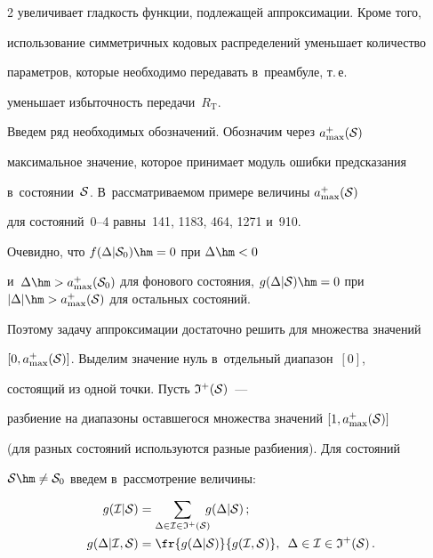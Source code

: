 \begin{multicols}{2}
увеличивает гладкость функции, подлежащей аппроксимации. Кроме того, 

использование симметричных кодовых распределений уменьшает количество 

параметров, которые необходимо передавать в~преамбуле, т.\,е.\ 

уменьшает избыточность передачи~$R_{\mathrm{T}}$.



Введем ряд необходимых обозначений. Обозначим через $a_{\max}^+({\cal S})$ 

максимальное значение, которое принимает модуль ошибки предсказания 

в~состоянии~${\cal S}$. В~рассматриваемом примере величины $a_{\max}^+({\cal S})$ 

для состояний~0--4 равны~141, 1183, 464, 1271 и~910. 

Очевидно, что $f(\Delta|{\cal S}_0)\hm= 0$ при $\Delta\hm< 0$ 

и~$\Delta\hm> a_{\max}^+({\cal S}_0)$ для фонового состояния,  $g(\Delta|{\cal S})\hm= 

0$  при $|\Delta|\hm> a_{\max}^+({\cal S})$ для остальных состояний. 

Поэтому задачу аппроксимации достаточно решить для множества значений 

$[0,a_{\max}^+({\cal S})]$. Выделим значение нуль в~отдельный диапазон~$[0]$, 

состоящий из одной точки. Пусть ${\frak I}^+({\cal S})$~--- 

разбиение на диапазоны оставшегося множества значений $[1,a_{\max}^+({\cal S})]$ 

(для разных состояний используются разные разбиения). Для состояний 

${\cal S}\hm\neq{\cal S}_0$ введем в~рассмотрение величины:



\noindent

\begin{align*}

g({\cal I}|{\cal S}) &= \sum\limits_{\Delta\in{\cal I}\in{\frak I}^+(\cal S)} 

\hspace*{-2mm}g(\Delta|{\cal S})\,;

\\

g(\Delta|{\cal I},{\cal S})& =\fr{g(\Delta|{\cal S})}{g({\cal I},{\cal S})}, \enskip

\Delta\in{\cal I}\in{\frak I}^+(\cal S)\,.


\end{align*}
\end{multicols}
